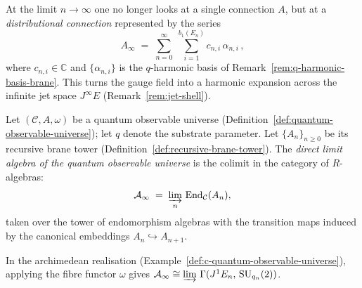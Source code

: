 
\begin{remark}
\label{rem:distributional-connection}
At the limit $n \to \infty$ one no longer looks at a single connection $A$,
but at a \emph{distributional connection} represented by the series
\[
  A_\infty
  \;=\;
  \sum_{n=0}^{\infty}\;\sum_{i=1}^{b_1(E_n)}
  c_{n,i}\,\alpha_{n,i}\,,
\]
where $c_{n,i} \in \mathbb{C}$ and $\{\alpha_{n,i}\}$ is the $q$-harmonic
basis of Remark~\ref{rem:q-harmonic-basis-brane}.  This turns the gauge field
into a harmonic expansion across the infinite jet space $J^\infty E$
(Remark~\ref{rem:jet-shell}).
\end{remark}


\begin{definition}
\label{def:direct-limit-algebra}
Let $(\mathcal{C}, A, \omega)$ be a quantum observable universe
(Definition~\ref{def:quantum-observable-universe}); let $q$ denote the substrate parameter.  Let
$\{A_n\}_{n \geq 0}$ be its recursive brane tower
(Definition~\ref{def:recursive-brane-tower}).  The
\emph{direct limit algebra of the quantum observable universe} is the
colimit in the category of $R$-algebras:
\[
  \mathcal{A}_\infty
  \;=\;
  \varinjlim_{n}\,
  \mathrm{End}_{\mathcal{C}}(A_n),
\]
taken over the tower of endomorphism algebras with the transition maps
induced by the canonical embeddings $A_n \hookrightarrow A_{n+1}$.

In the archimedean realisation
(Example~\ref{def:c-quantum-observable-universe}), applying the fibre
functor $\omega$ gives
$\mathcal{A}_\infty \cong
\varinjlim\,\Gamma(J^1 E_n,\, \mathrm{SU}_{q_n}(2))$.
\end{definition}

